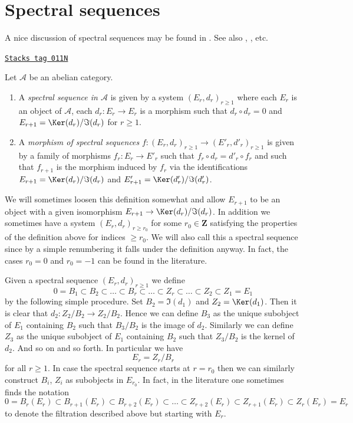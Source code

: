 \section{Spectral sequences}
\label{homology-section-spectral-sequence}
A nice discussion of spectral sequences may be found in
\cite{Eisenbud}. See also \cite{McCleary}, \cite{Lang}, etc.

\begin{definition}
\label{homology-definition-spectral-sequence}
\href{https://stacks.math.columbia.edu/tag/011N}{\texttt{Stacks tag 011N}}

Let $\mathcal{A}$ be an abelian category.
\begin{enumerate}
\item A {\it spectral sequence in $\mathcal{A}$} is given by a
system $(E_r, d_r)_{r \geq 1}$ where each $E_r$ is an object
of $\mathcal{A}$, each $d_r : E_r \to E_r$ is a morphism such
that $d_r \circ d_r = 0$ and $E_{r + 1} = \Ker(d_r)/\Im(d_r)$
for $r \geq 1$.
\item A {\it morphism of spectral sequences}
$f : (E_r, d_r)_{r \geq 1} \to (E'_r, d'_r)_{r \geq 1}$ is
given by a family of morphisms $f_r : E_r \to E'_r$ such that
$f_r \circ d_r = d'_r \circ f_r$ and such that $f_{r + 1}$
is the morphism induced by $f_r$ via the identifications
$E_{r + 1} = \Ker(d_r)/\Im(d_r)$
and
$E'_{r + 1} = \Ker(d'_r)/\Im(d'_r)$.
\end{enumerate}
\end{definition}

We will sometimes loosen this definition somewhat and allow $E_{r + 1}$
to be an object with a given isomorphism
$E_{r + 1} \to \Ker(d_r)/\Im(d_r)$.
In addition we sometimes have a system $(E_r, d_r)_{r \geq r_0}$
for some $r_0 \in \mathbf{Z}$ satisfying the properties of the definition above
for indices $\geq r_0$. We will also call this a spectral sequence since by
a simple renumbering it falls under the definition anyway.
In fact, the cases $r_0 = 0$ and $r_0 = -1$ can be found in the literature.

\medskip\noindent
Given a spectral sequence $(E_r, d_r)_{r \geq 1}$ we define
$$
0 = B_1 \subset B_2 \subset \ldots \subset B_r \subset \ldots
\subset Z_r \subset \ldots \subset Z_2 \subset Z_1 = E_1
$$
by the following simple procedure. Set $B_2 = \Im(d_1)$
and $Z_2 = \Ker(d_1)$. Then it is clear that
$d_2 : Z_2/B_2 \to Z_2/B_2$. Hence we can define $B_3$ as the unique
subobject of $E_1$ containing $B_2$ such that $B_3/B_2$ is the image
of $d_2$. Similarly we can define $Z_3$ as the unique subobject of
$E_1$ containing $B_2$ such that $Z_3/B_2$ is the kernel of $d_2$.
And so on and so forth. In particular we have
$$
E_r = Z_r/B_r
$$
for all $r \geq 1$. In case the spectral sequence starts at $r = r_0$
then we can similarly construct $B_i$, $Z_i$ as subobjects in $E_{r_0}$.
In fact, in the literature one sometimes finds the notation
$$
0 = B_r(E_r) \subset B_{r + 1}(E_r) \subset B_{r + 2}(E_r) \subset \ldots
\subset Z_{r + 2}(E_r) \subset Z_{r + 1}(E_r) \subset Z_r(E_r) = E_r
$$
to denote the filtration described above but starting with $E_r$.

